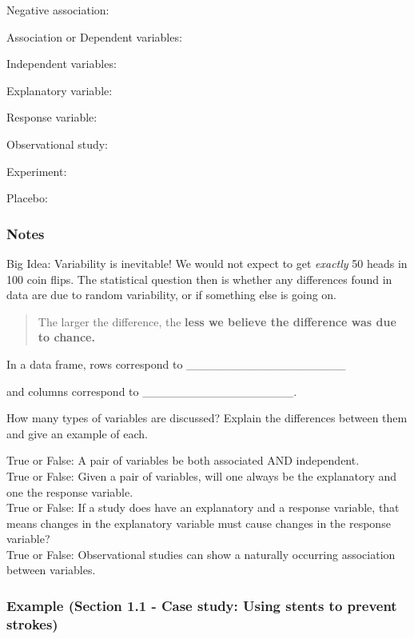 \documentclass[
]{report}
\newcommand{\rgs}{\vspace{12pt}} %
\newcommand{\rgi}{\hspace{24pt}}  %
\begin{document}
\rgi Negative association:

Association or Dependent variables:
\rgs

Independent variables:
\rgs

Explanatory variable:
\rgs

Response variable:
\rgs

Observational study:
\rgs

Experiment:
\rgs

Placebo:
\rgs

\hypertarget{notes}{%
\subsubsection*{Notes}\label{notes}}

Big Idea: Variability is inevitable! We would not expect to get \emph{exactly} 50 heads in 100 coin flips. The statistical question then is whether any differences found in data are due to random variability, or if something else is going on.

\begin{quote}
The larger the difference, the \textbf{less we believe the difference was due to chance.}
\end{quote}

In a data frame, rows correspond to \_\_\_\_\_\_\_\_\_\_\_\_\_\_\_\_\_\_\_

and columns correspond to \_\_\_\_\_\_\_\_\_\_\_\_\_\_\_\_\_\_.

How many types of variables are discussed? Explain the differences between them and give an example of each.
\rgs
\rgs

True or False: A pair of variables be both associated AND independent.\\
True or False: Given a pair of variables, will one always be the explanatory and one the response variable.\\
True or False: If a study does have an explanatory and a response variable, that means changes in the explanatory variable must cause changes in the response variable?\\
True or False: Observational studies can show a naturally occurring association between variables.

\hypertarget{example-section-1.1---case-study-using-stents-to-prevent-strokes}{%
\subsubsection*{Example (Section 1.1 - Case study: Using stents to prevent strokes)}\label{example-section-1.1---case-study-using-stents-to-prevent-strokes}}
\end{document}
